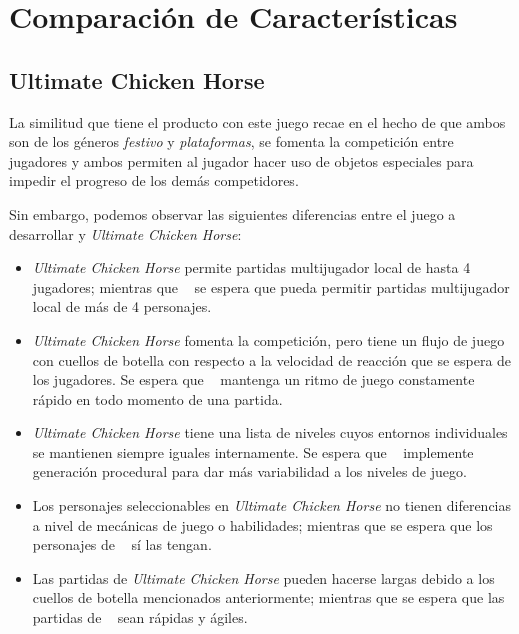\section{Comparación de Características} %


\subsection{Ultimate Chicken Horse}

La similitud que tiene el producto con este juego recae en el hecho de que ambos
son de los géneros \emph{festivo} y \emph{plataformas}, se fomenta la
competición entre jugadores y ambos permiten al jugador hacer uso de objetos
especiales para impedir el progreso de los demás competidores.

Sin embargo, podemos observar las siguientes diferencias entre el juego a
desarrollar y \emph{Ultimate Chicken Horse}:
\begin{itemize}
    \item \emph{Ultimate Chicken Horse} permite partidas multijugador local de
    hasta 4 jugadores; mientras que \emph{\izenburua\ } se espera que pueda
    permitir partidas multijugador local de más de 4 personajes.
    \item \emph{Ultimate Chicken Horse} fomenta la competición, pero tiene un
    flujo de juego con cuellos de botella con respecto a la velocidad de
    reacción que se espera de los jugadores. Se espera que \emph{\izenburua\ }
    mantenga un ritmo de juego constamente rápido en todo momento de una
    partida.
    \item \emph{Ultimate Chicken Horse} tiene una lista de niveles cuyos
    entornos individuales se mantienen siempre iguales internamente. Se espera
    que \emph{\izenburua\ } implemente generación procedural para dar más
    variabilidad a los niveles de juego.
    \item Los personajes seleccionables en \emph{Ultimate Chicken Horse} no
    tienen diferencias a nivel de mecánicas de juego o habilidades; mientras que
    se espera que los personajes de \emph{\izenburua\ } sí las tengan.
    \item Las partidas de \emph{Ultimate Chicken Horse} pueden hacerse largas
    debido a los cuellos de botella mencionados anteriormente; mientras que se
    espera que las partidas de \emph{\izenburua\ } sean rápidas y ágiles.
\end{itemize}


